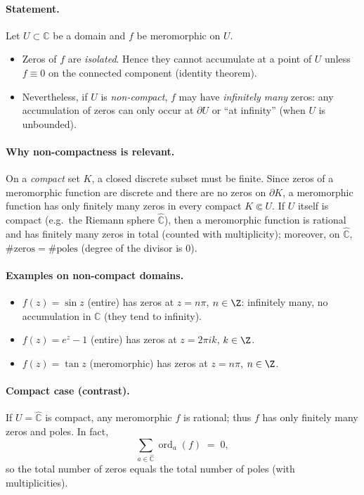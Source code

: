 \documentclass[12pt,a4paper]{article}
\newcommand{\C}{\mathbb{C}}
\begin{document}
\paragraph{Statement.}
Let $U\subset\C$ be a domain and $f$ be meromorphic on $U$.
\begin{itemize}
	\item Zeros of $f$ are \emph{isolated}. Hence they cannot accumulate at a point of $U$
	unless $f\equiv 0$ on the connected component (identity theorem).
	\item Nevertheless, if $U$ is \emph{non-compact}, $f$ may have \emph{infinitely many} zeros:
	any accumulation of zeros can only occur at $\partial U$ or ``at infinity''
	(when $U$ is unbounded).
\end{itemize}

\paragraph{Why non-compactness is relevant.}
On a \emph{compact} set $K$, a closed discrete subset must be finite.  Since zeros of a
meromorphic function are discrete and there are no zeros on $\partial K$, a meromorphic
function has only finitely many zeros in every compact $K\Subset U$.  If $U$ itself is
compact (e.g.\ the Riemann sphere $\widehat{\C}$), then a meromorphic function is rational
and has finitely many zeros in total (counted with multiplicity); moreover, on
$\widehat{\C}$, $\#\text{zeros}=\#\text{poles}$ (degree of the divisor is $0$).

\paragraph{Examples on non-compact domains.}
\begin{itemize}
	\item $f(z)=\sin z$ (entire) has zeros at $z=n\pi$, $n\in\Z$:
	infinitely many, no accumulation in $\C$ (they tend to infinity).
	\item $f(z)=e^{z}-1$ (entire) has zeros at $z=2\pi i k$, $k\in\Z$.
	\item $f(z)=\tan z$ (meromorphic) has zeros at $z=n\pi$, $n\in\Z$.
\end{itemize}

\paragraph{Compact case (contrast).}
If $U=\widehat{\C}$ is compact, any meromorphic $f$ is rational; thus $f$ has only finitely
many zeros and poles.  In fact,
\[
\sum_{a\in\widehat{\C}} \operatorname{ord}_a(f) \;=\; 0,
\]
so the total number of zeros equals the total number of poles (with multiplicities).
\end{document}
